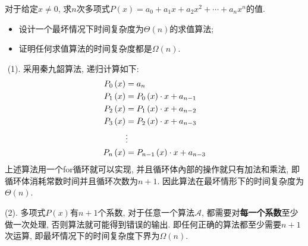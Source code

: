 \documentclass{article}
\begin{document}
\begin{homeworkProblem}
	对于给定$x\neq 0$, 求$n$次多项式$P(x)=a_0+a_1x+a_2x^2+\cdots+a_nx^n$的值.
	\begin{itemize}
		\item 设计一个最坏情况下时间复杂度为$\Theta(n)$的求值算法;
		\item 证明任何求值算法的时间复杂度都是$\Omega(n)$.
	\end{itemize}
	\solution \,\,(1). 采用秦九韶算法, 递归计算如下:
	\begin{align}
		P_0\left( x \right) &=a_n \notag
		\\
		P_1\left( x \right) &=P_0\left( x \right) \cdot x+a_{n-1} \notag
		\\
		P_2\left( x \right) &=P_1\left( x \right) \cdot x+a_{n-2} \notag
		\\
		P_3\left( x \right) &=P_2\left( x \right) \cdot x+a_{n-3} \notag
		\\
		&\vdots  \notag
		\\
		P_n\left( x \right) &=P_{n-1}\left( x \right) \cdot x+a_{n-3} \notag
	\end{align}
	上述算法用一个for循环就可以实现, 并且循环体內部的操作就只有加法和乘法, 即循环体消耗常数时间并且循环次数为$n+1$. 因此算法在最坏情形下的时间复杂度为$\Theta(n)$.

	(2). 多项式$P(x)$有$n+1$个系数, 对于任意一个算法$\mathcal{A}$, 都需要对\textbf{每一个系数}至少做一次处理, 否则算法就可能得到错误的输出. 即任何正确的算法都至少需要$n+1$次运算, 即最坏情况下的时间复杂度下界为$\Omega(n)$.
\end{homeworkProblem}
\end{document}
